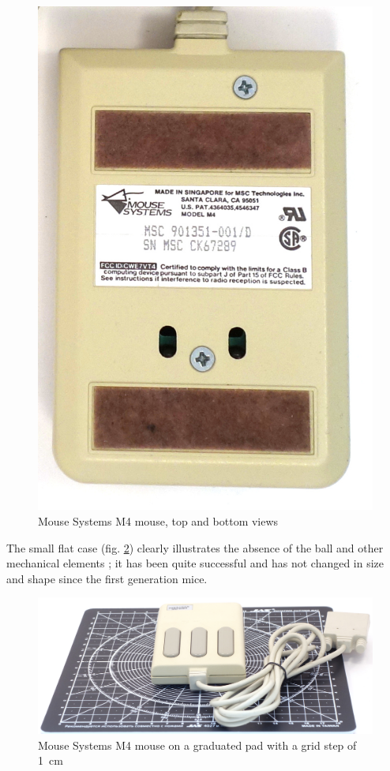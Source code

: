 \documentclass[11pt, a4paper]{article}
\begin{document}
\begin{figure}[h]
    \includegraphics[scale=0.7]{1988_mouse_systems_m4/bottom_30.jpg}
    \caption{Mouse Systems M4 mouse, top and bottom views}
    \label{fig:mscM4TopBottom}
\end{figure}

The small flat case (fig. \ref{fig:mscM4Size}) clearly illustrates the absence of the ball and other mechanical elements \cite{pcmag}; it has been quite successful and has not changed in size and shape since the first generation \cite{old} mice.

\begin{figure}[h]
    \centering
    \includegraphics[width=\textwidth]{1988_mouse_systems_m4/size_30.jpg}
    \caption{Mouse Systems M4 mouse on a graduated pad with a grid step of 1~cm}
    \label{fig:mscM4Size}
\end{figure}
\end{document}
